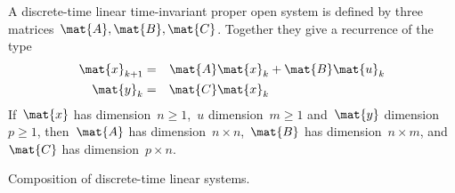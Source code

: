 \label{ex:discrete-time-linear}
\begin{definition}
    \label{def:dicrete-time-linear-system}
    A discrete-time linear time-invariant proper open system is defined by three matrices~$\mat{A},\mat{B},\mat{C}$.
    Together they give a recurrence of the type
    \begin{equation}
        \label{eq:discrete-time-dynamics}
        \begin{aligned}
            \mat{x}_{k+1} &=& \mat{A} \mat{x}_k & + \mat{B} \mat{u}_k \\
            \mat{y}_{k}   &=& \mat{C} \mat{x}_k  \\
        \end{aligned}
    \end{equation}
    If~$\mat{x}$ has dimension~$n\geq1$,~$u$ dimension~$m\geq1$ and~$\mat{y}$ dimension~$p\geq1$, then~$\mat{A}$ has dimension~$n \times n$,~$\mat{B}$ has dimension~$n \times m$, and~$\mat{C}$ has dimension~$p \times n$.
\end{definition}

\begin{marginfigure}
    \begin{center}
    \end{center}
    \caption{Composition of discrete-time linear systems.}
    \label{fig:comp_dyn_syst}
\end{marginfigure}

